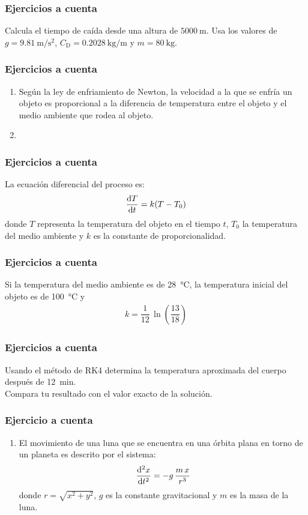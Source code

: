 \documentclass[12pt]{beamer}
\begin{document}
\begin{frame}
\frametitle{Ejercicios a cuenta}
Calcula el tiempo de caída desde una altura de $\SI{5000}{\meter}$. Usa los valores de $g = \SI{9.81}{\meter\per\square\second}$, $C_{\text{D}} = \SI{0.2028 }{\kilo\gram\per\metre}$ y $m = \SI{80}{\kilo\gram}$.
\end{frame}
\begin{frame}
\frametitle{Ejercicios a cuenta}
\begin{enumerate}
\conti
\item Según la ley de enfriamiento de Newton, la velocidad a la que se enfría un objeto es proporcional a la diferencia de temperatura entre el objeto y el medio ambiente que rodea al objeto.
\item 
\seti
\end{enumerate}
\end{frame}
\begin{frame}
\frametitle{Ejercicios a cuenta}
La ecuación diferencial del proceso es:
\begin{align*}
\dv{T}{t} = k (T - T_{0})
\end{align*}
donde $T$ representa la temperatura del objeto en el tiempo $t$, $T_{0}$ la temperatura del medio ambiente y $k$ es la constante de proporcionalidad.
\end{frame}
\begin{frame}
\frametitle{Ejercicios a cuenta}
Si la temperatura del medio ambiente es de \SI{28}{\degreeCelsius}, la temperatura inicial del objeto es de \SI{100}{\degreeCelsius} y
\begin{align*}
k = \dfrac{1}{12} \, \ln \left( \dfrac{13}{18} \right)
\end{align*}
\end{frame}
\begin{frame}
\frametitle{Ejercicios a cuenta}
Usando el método de RK4 determina la temperatura aproximada del cuerpo después de \SI{12}{\minute}.
\\
\bigskip
\pause
Compara tu resultado con el valor exacto de la solución.
\end{frame}
\begin{frame}
\frametitle{Ejercicio a cuenta}
\begin{enumerate}
\conti
\item El movimiento de una luna que se encuentra en una órbita plana en torno de un planeta es descrito por el sistema:
\begin{align*}
\dv[2]{x}{t} = - g \, \dfrac{m \, x}{r^{3}}
\end{align*}
donde $r = \sqrt{x^{2} + y^{2}}$, $g$ es la constante gravitacional y $m$ es la masa de la luna.
\seti
\end{enumerate}
\end{frame}
\end{document}
